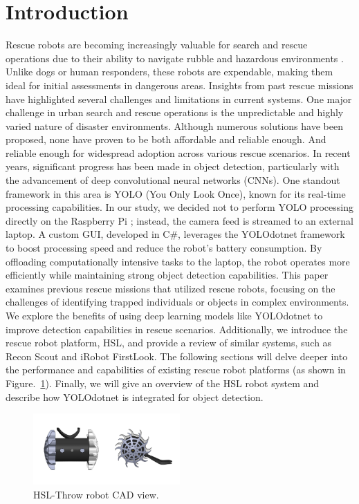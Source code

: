 \documentclass[conference]{IEEEtran}
\begin{document}
\section{Introduction}
Rescue robots are becoming increasingly valuable for search and rescue operations due to their ability to navigate rubble and hazardous environments \cite{Messina2007}. Unlike dogs or human responders, these robots are expendable, making them ideal for initial assessments in dangerous areas. Insights from past rescue missions have highlighted several challenges and limitations in current systems. One major challenge in urban search and rescue operations is the unpredictable and highly varied nature of disaster environments. Although numerous solutions have been proposed, none have proven to be both affordable and reliable enough. And reliable enough for widespread adoption across various rescue scenarios. In recent years, significant progress has been made in object detection, particularly with the advancement of deep convolutional neural networks (CNNs). One standout framework in this area is YOLO (You Only Look Once), known for its real-time processing capabilities. In our study, we decided not to perform YOLO processing directly on the Raspberry Pi \cite{Yao2022}; instead, the camera feed is streamed to an external laptop. A custom GUI, developed in C\#, leverages the YOLOdotnet framework to boost processing speed and reduce the robot's battery consumption. By offloading computationally intensive tasks to the laptop, the robot operates more efficiently while maintaining strong object detection capabilities. This paper examines previous rescue missions that utilized rescue robots, focusing on the challenges of identifying trapped individuals or objects in complex environments. We explore the benefits of using deep learning models like YOLOdotnet to improve detection capabilities in rescue scenarios. Additionally, we introduce the rescue robot platform, HSL, and provide a review of similar systems, such as Recon Scout and iRobot FirstLook. The following sections will delve deeper into the performance and capabilities of existing rescue robot platforms (as shown in Figure.~\ref{fig_First}). Finally, we will give an overview of the HSL robot system and describe how YOLOdotnet is integrated for object detection.

\begin{figure}[htbp]
\centerline{\includegraphics[width=0.5\textwidth]{Fig_First.PNG}}
\caption{HSL-Throw robot CAD view.}
\label{fig_First}
\end{figure}
\end{document}
